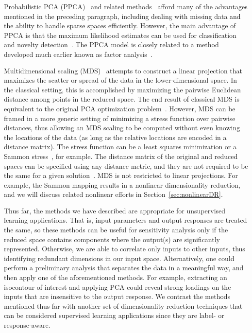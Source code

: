 Probabilistic PCA (PPCA)~\cite{TippingBishop1999} and related methods~\cite{Roweis1998,WellingAgakovWilliams2003,WilliamsAgakov2002} afford many of the advantages mentioned in the preceding paragraph, including dealing with missing data and the ability to handle sparse spaces efficiently.
%
However, the main advantage of PPCA is that the maximum likelihood estimates can be used for classification and novelty detection~\cite{TippingBishop1999}.
%
The PPCA model is closely related to a method developed much earlier known as factor analysis~\cite{Spearman1904b}.

Multidimensional scaling (MDS)~\cite{BorgGroenen2005,CoxCox2000,Torgerson1952} attempts to construct a linear projection that maximizes the scatter or spread of the data in the lower-dimensional space.
%
In the classical setting, this is accomplished by maximizing the pairwise Euclidean distance among points in the reduced space.
%
The end result of classical MDS is equivalent to the original PCA optimization problem~\cite{BorgGroenen2005,CoxCox2000,MardiaKentBibby1979,Williams2002}.
%
However, MDS can be framed in a more generic setting of minimizing a stress function over pairwise distances, thus allowing an MDS scaling to be computed without even knowing the locations of the data (as long as the relative locations are encoded in a distance matrix).
%
The stress function can be a least squares minimization or a Sammon stress~\cite{Sammon1969}, for example.
%
The distance matrix of the original and reduced spaces can be specified using any distance metric, and they are not required to be the same for a given solution~\cite{CunninghamGhahramani2015}.
%
MDS is not restricted to linear projections.
%
For example, the Sammon mapping results in a nonlinear dimensionality reduction, and we will discuss related nonlinear efforts in Section~\ref{sec:nonlinearDR}.

Thus far, the methods we have described are appropriate for unsupervised learning applications.
%
That is, input parameters and output responses are treated the same, so these methods can be useful for sensitivity analysis only if the reduced space contains components where the output(s) are significantly represented.
%
Otherwise, we are able to correlate only inputs to other inputs, thus identifying redundant dimensions in our input space.
%
Alternatively, one could perform a preliminary analysis that separates the data in a meaningful way, and then apply one of the aforementioned methods.
%
For example, extracting an isocontour of interest and applying PCA could reveal strong loadings on the inputs that are insensitive to the output response.
%
We contrast the methods mentioned thus far with another set of dimensionality reduction techniques that can be considered supervised learning applications since they are label- or response-aware.

